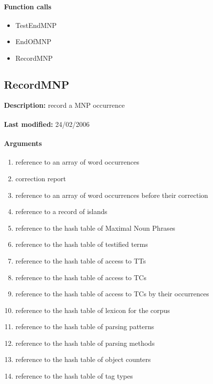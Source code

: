 \paragraph{Function calls}
\begin{itemize}
\item TestEndMNP
\item EndOfMNP
\item RecordMNP
\end{itemize}

\subsection{RecordMNP}
\textbf{Description:} record a MNP occurrence\\
\\\textbf{Last modified:} 24/02/2006

\paragraph{Arguments}
\begin{enumerate}
\item reference to an array of word occurrences
\item correction report
\item reference to an array of word occurrences before their correction
\item reference to a record of islands
\item reference to the hash table of Maximal Noun Phrases
\item reference to the hash table of testified terms
\item reference to the hash table of access to TTs
\item reference to the hash table of access to TCs
\item reference to the hash table of access to TCs by their occurrences
\item reference to the hash table of lexicon for the corpus
\item reference to the hash table of parsing patterns
\item reference to the hash table of parsing methods
\item reference to the hash table of object counters
\item reference to the hash table of tag types
\end{enumerate}

